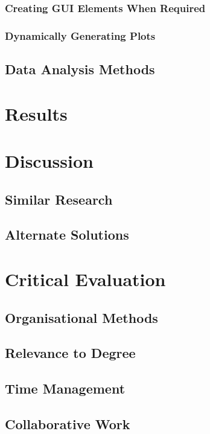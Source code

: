 \documentclass[11pt]{report}
\begin{document}
\subsection{Creating GUI Elements When Required}
\label{sec:org0eee0fa}
\subsection{Dynamically Generating Plots}
\label{sec:orgf1a7cfe}
\section{Data Analysis Methods}
\label{sec:orgb72e73b}


\chapter{Results}
\label{sec:org58d34e5}
\chapter{Discussion}
\label{sec:org8e26da3}
\section{Similar Research}
\label{sec:orgc2884a6}
\section{Alternate Solutions}
\label{sec:orgc405f90}
\chapter{Critical Evaluation}
\label{sec:orgc691476}
\section{Organisational Methods}
\label{sec:orgfbdf351}
\section{Relevance to Degree}
\label{sec:orgd000e4f}
\section{Time Management}
\label{sec:orgfbb7391}
\section{Collaborative Work}
\label{sec:orga0dbd57}
\end{document}
